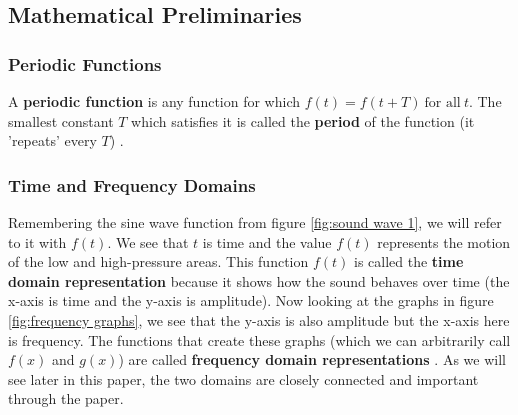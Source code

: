 \documentclass[10pt]{article}
\begin{document}









\subsection{Mathematical Preliminaries}



\subsubsection{Periodic Functions}
\hspace{\parindent} A \textbf{periodic function} is any function for which $f(t) = f(t + T) \: \text{for all} \: t$.
The smallest constant $T$ which satisfies it is called the \textbf{period} of the function (it 'repeats' every $T$) \cite{hsu1970fourier}.







\subsubsection{Time and Frequency Domains}
\hspace{\parindent} Remembering the sine wave function from figure \ref{fig:sound wave 1}, we will refer to it with $f(t)$. We see that $t$ is time and the value $f(t)$ represents the motion of the low and high-pressure areas. This function $f(t)$ is called the \textbf{time domain representation} because it shows how the sound behaves over time (the x-axis is time and the y-axis is amplitude). Now looking at the graphs in figure \ref{fig:frequency graphs}, we see that the y-axis is also amplitude but the x-axis here is frequency. The functions that create these graphs (which we can arbitrarily call $f(x)$ and $g(x)$) are called \textbf{frequency domain representations} \cite{morrison1994fourier}. As we will see later in this paper, the two domains are closely connected and important through the paper.
\end{document}
